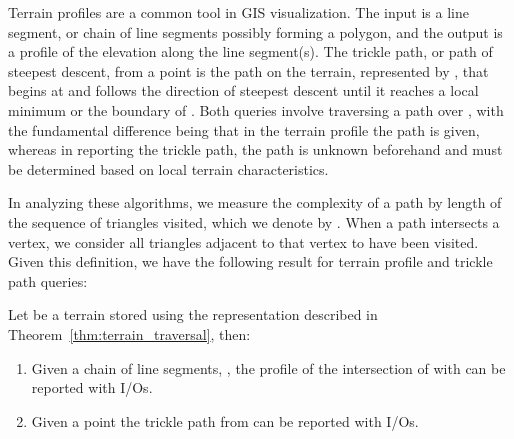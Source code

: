   Terrain profiles are a common tool in GIS visualization. 
  The input is a line segment, or chain of line segments possibly forming a polygon, 
  and the output is a profile of the elevation along the line segment(s). 
  The trickle path, or path of steepest descent, from a point  is the path on
  the terrain, represented by , 
  that begins at  and follows the direction of steepest descent until it reaches 
  a local minimum or the boundary of  \cite{DBLP:conf/cccg/BergBDKOGRSY96}. 
  Both queries involve traversing a path over , with the fundamental 
  difference being that in the terrain profile the path is given, whereas in 
  reporting the trickle path, the path is unknown beforehand and must be 
  determined based on local terrain characteristics.

  In analyzing these algorithms, we measure the complexity of a path by length 
  of the sequence of triangles visited, which we denote by . 
  When a path intersects a vertex, we consider all triangles adjacent to that 
  vertex to have been visited. 
  Given this definition, we have the following result for terrain profile and 
  trickle path queries:

  \begin{lemma}\label{lem:tprofile_tpath}
  Let  be a terrain stored using the representation described
  in Theorem~\ref{thm:terrain_traversal}, then:
  \begin{enumerate}
  \item{ Given a chain of line segments, , the profile of the intersection 
  of  with  can be reported with  I/Os.}
  \item{ Given a point  the trickle path from  can be reported with 
   I/Os.}
  \end{enumerate}
  \end{lemma}

